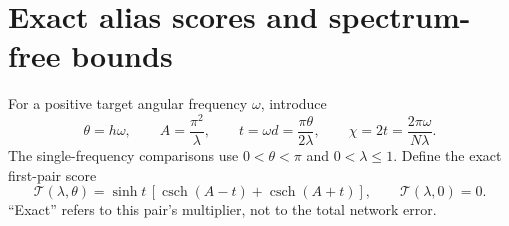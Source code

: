 \documentclass[11pt]{article}
\theoremstyle{definition}\newtheorem{definition}[theorem]{Definition}
\theoremstyle{remark}\newtheorem{remark}[theorem]{Remark}
\numberwithin{equation}{section}
\DeclareMathOperator{\csch}{csch}
\newcommand{\T}{\mathcal T}
\begin{document}
\section{Exact alias scores and spectrum-free bounds}
\label{sec:poles}
For a positive target angular frequency $\omega$, introduce
\begin{equation}
 \theta=h\omega,\qquad A=\frac{\pi^2}{\lambda},\qquad
 t=\omega d=\frac{\pi\theta}{2\lambda},\qquad
 \chi=2t=\frac{2\pi\omega}{N\lambda}.
 \label{eq:angles}
\end{equation}
The single-frequency comparisons use $0<\theta<\pi$ and $0<\lambda\le1$. Define the exact first-pair score
\begin{equation}
 \boxed{\T(\lambda,\theta)=
 \sinh t\,[\csch(A-t)+\csch(A+t)],\qquad \T(\lambda,0)=0.}
 \label{eq:T}
\end{equation}
``Exact'' refers to this pair's multiplier, not to the total network error.
\end{document}
